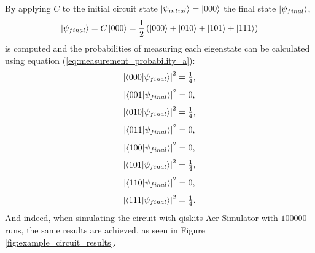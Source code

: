 	By applying $C$ to the initial circuit state $\ket{\psi_{intial}}=\ket{000}$ the final state $\ket{\psi_{final}}$,
	\begin{equation}
		\label{eq:example_circuit_final_state}
		\ket{\psi_{final}}=C\ket{000}=\frac{1}{2}\left(\ket{000}+\ket{010}+\ket{101}+\ket{111}\right)
	\end{equation}
	is computed and the probabilities of measuring each eigenstate can be calculated using equation (\ref{eq:measurement_probability_a}):
	\begin{equation}
		\label{eq:example_circuit_probability_000}
		\abs{\braket{000}{\psi_{final}}}^2=\tfrac{1}{4},
	\end{equation}
	\begin{equation}
		\label{eq:example_circuit_probability_001}
		\abs{\braket{001}{\psi_{final}}}^2=0,
	\end{equation}
	\begin{equation}
		\label{eq:example_circuit_probability_010}
		\abs{\braket{010}{\psi_{final}}}^2=\tfrac{1}{4},
	\end{equation}
	\begin{equation}
		\label{eq:example_circuit_probability_011}
		\abs{\braket{011}{\psi_{final}}}^2=0,
	\end{equation}
	\begin{equation}
		\label{eq:example_circuit_probability_100}
		\abs{\braket{100}{\psi_{final}}}^2=0,
	\end{equation}
	\begin{equation}
		\label{eq:example_circuit_probability_101}
		\abs{\braket{101}{\psi_{final}}}^2=\tfrac{1}{4},
	\end{equation}
	\begin{equation}
		\label{eq:example_circuit_probability_110}
		\abs{\braket{110}{\psi_{final}}}^2=0,
	\end{equation}
	\begin{equation}
		\label{eq:example_circuit_probability_111}
		\abs{\braket{111}{\psi_{final}}}^2=\tfrac{1}{4}.
	\end{equation}
	And indeed, when simulating the circuit with qiskits Aer-Simulator \cite{qiskit2024} with $100000$ runs, the same results are achieved, as seen in Figure \ref{fig:example_circuit_results}.
